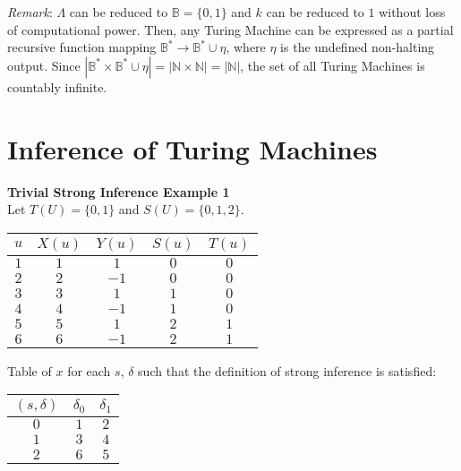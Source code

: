 \documentclass[11pt]{article}
\newcommand{\N}{\mathbb{N}}
\newcommand{\B}{\mathbb{B}}
\begin{document}
\bigbreak

\textit{Remark}: $\Lambda$ can be reduced to $ \B = \{0, 1\} $ and $ k $ can be reduced to $ 1 $ without loss of computational power. Then, any Turing Machine can be expressed as a partial recursive function mapping $ \B^{*} \rightarrow \B^{*} \cup \eta $, where $ \eta $ is the undefined non-halting output. Since $ |\B^{*} \times \B^{*} \cup \eta | = | \N \times \N | = | \N | $, the set of all Turing Machines is countably infinite. 

\pagebreak


\section{Inference of Turing Machines} 
 
 \textbf{Trivial Strong Inference Example 1} \\
 
 Let $ T(U) = \{0 , 1\} $ and $ S(U) = \{0, 1, 2\} $.  
 \begin{center}
 \begin{tabular}{ c||c|c|c|c } 

 $ u $ & $ X(u) $ & $ Y(u) $ & $ S(u) $ & $ T(u) $ \\ 
 \hline
 \hline
 $ 1 $ & $ 1 $ & $ 1 $ & $ 0 $ & $ 0 $ \\
 \hline
 $ 2 $ & $ 2 $ & $ -1 $ & $ 0 $ & $ 0 $ \\
 \hline
 $ 3 $ & $ 3 $ & $ 1 $ & $ 1 $ & $ 0 $ \\
 \hline
 $ 4 $ & $ 4 $ & $ -1 $ & $ 1 $ & $ 0 $ \\
 \hline 
 $ 5 $ & $ 5 $ & $ 1 $ & $ 2 $ & $ 1 $ \\
 \hline 
 $ 6 $ & $ 6 $ & $ -1 $ & $ 2 $ & $ 1 $ \\
 \hline 
 
 \end{tabular}
 \end{center} 
 
  Table of $ x $ for each $ s $, $ \delta $ such that the definition of strong inference is satisfied:
 \begin{center}
 \begin{tabular}{ c||c|c } 

 $ (s, \delta) $ & $ \delta_0 $ & $ \delta_1 $ \\ 
 \hline
 \hline
 $ 0 $ & $ 1 $ & $ 2 $  \\
 \hline
 $ 1 $ & $ 3 $ & $ 4 $ \\
 \hline
 $ 2 $ & $ 6 $ & $ 5 $ \\

 
 \end{tabular}
 \end{center} 
 
\end{document}
